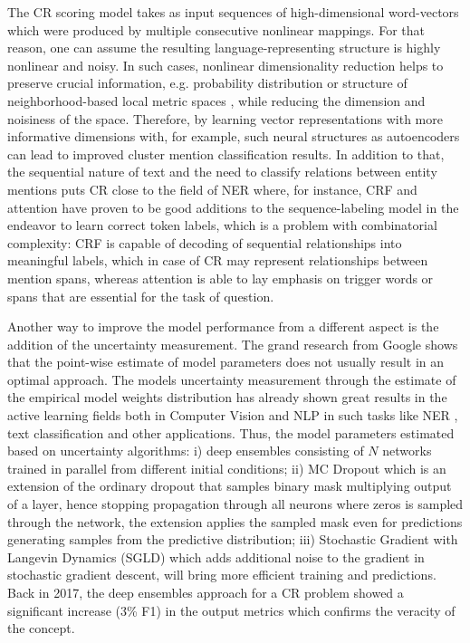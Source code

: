 The CR scoring model takes as input sequences of high-dimensional word-vectors which were produced by multiple consecutive nonlinear mappings. For that reason, one can assume the resulting language-representing structure is highly nonlinear and noisy. 
In such cases, nonlinear dimensionality reduction helps to preserve crucial information, e.g. probability distribution \cite{dr-VanderMaaten2014} or structure of neighborhood-based local metric spaces \cite{dr-McInnes2018}, while reducing the dimension and noisiness of the space. 
Therefore, by learning vector representations with more informative dimensions with, for example, such neural structures as autoencoders \cite{autoencoders-Zabalza2016,autoencoders-Sahay2019} can lead to improved cluster mention classification results. 
In addition to that, the sequential nature of text and the need to classify relations between entity mentions puts CR close to the field of NER where, for instance, CRF \cite{ner-Strakova2019,ner-Zhanming2019} and attention \cite{ner-Yamada2020,translation-Bahdanau2014} have proven to be good additions  to the sequence-labeling model in the endeavor to learn correct token labels, which is a problem with combinatorial complexity: CRF is capable of decoding of sequential relationships into meaningful labels, which in case of CR may represent relationships between mention spans, whereas attention is able to lay emphasis on trigger words or spans that are essential for the task of question.

Another way to improve the model performance from a different aspect is the addition of the uncertainty measurement. 
The grand research from Google \cite{ovadia2019can} shows that the point-wise estimate of model parameters does not usually result in an optimal approach. 
The models uncertainty measurement through the estimate of the empirical model weights distribution has already shown great results in the active learning fields both in Computer Vision \cite{gal2017deep} and NLP in such tasks like NER \cite{shen2017deep, lowell2018practical}, text classification \cite{an2018deep} and other applications. 
Thus, the model parameters estimated based on uncertainty algorithms: i) deep ensembles \cite{lakshminarayanan2016simple} consisting of $N$ networks trained in parallel from different initial conditions; ii) MC Dropout \cite{gal2017deep} which is an extension of the ordinary dropout that samples binary mask multiplying output of a layer, hence stopping propagation through all neurons where zeros is sampled through the network, the extension applies the sampled mask even for predictions generating samples from the predictive distribution; iii) Stochastic Gradient with Langevin Dynamics (SGLD) \cite{welling2011bayesian} which adds additional noise to the gradient in stochastic gradient descent, will bring more efficient training and predictions. 
Back in 2017, the deep ensembles approach for a CR problem \cite{cr-Lee17} showed a significant increase (3\% F1) in the output metrics which confirms the veracity of the concept.

